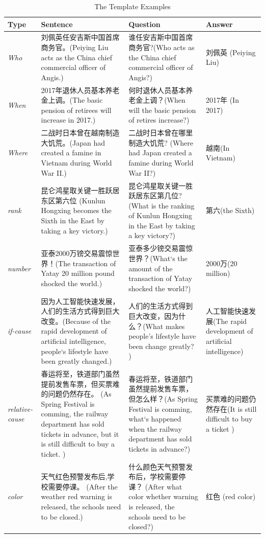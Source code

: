 \documentclass[runningheads,UTF8,article]{comsis2}
\begin{document}
	
	
	\iffalse
	\begin{table}[!ht]
		\centering
		\caption{The Template Examples}
		\setlength\tabcolsep{0.5em}
		\label{example}
		\begin{tabular}{|p{25pt}|p{125pt} | p{120pt} |p{45pt}|}
			\hline
			Type& Sentence & Question & Answer \\
			\hline
			\emph{Who} & 刘佩英任安吉斯中国首席商务官。(Peiying Liu acts as the China chief commercial officer of Angis.) & 谁任安吉斯中国首席商务官?(Who acts as the China chief commercial officer of Angis?)& 刘佩英    (Peiying Liu)\\
			\hline
			\emph{When} & 2017年退休人员基本养老金上调。(The basic pension of retirees will increase in 2017.) & 何时退休人员基本养老金上调？(When will the basic pension of retires increase?) & 2017年 (In 2017) \\
			\hline
			\emph{Where} & 二战时日本曾在越南制造大饥荒。(Japan had created a famine in Vietnam during World War II.)& 二战时日本曾在哪里制造大饥荒?	(Where had Japan created a famine during World War II?) & 越南(In Vietnam)\\
			\hline
			\emph{rank}& 昆仑鸿星取关键一胜跃居东区第六位 (Kunlun Hongxing becomes the Sixth in the East by taking a key victory.)& 昆仑鸿星取关键一胜跃居东区第几位?(What is the ranking of Kunlun Hongxing in the East by taking a key victory?)& 第六(the Sixth)\\
			\hline
			\emph{number}& 亚泰2000万镑交易震惊世界！(The transaction of Yatay 20 million pound shocked the world.)& 亚泰多少镑交易震惊世界？(What`s the amount of the transaction of Yatay shocked the world?)& 2000万(20 million) \\
			\hline
			\emph{if-cause}& 因为人工智能快速发展，人们的生活方式得到巨大改变。(Because of the rapid development of artificial intelligence, people`s lifestyle have been greatly changed.)&	人们的生活方式得到巨大改变，因为什么？(What makes people's lifestyle have been change greatly? )&	人工智能快速发展(The rapid development of artificial intelligence)\\
			\hline
			\emph{relative-cause}& 春运将至，铁道部门虽然提前发售车票，但买票难的问题仍然存在。	(As Spring Festival is comming, the railway department has sold tickets in advance, but it is still difficult to buy a ticket. )&春运将至，铁道部门虽然提前发售车票，但怎么样？(As Spring Festival is comming, what`s happened when the railway department has sold tickets in advance?)&	买票难的问题仍然存在(It is still difficult to buy a ticket )\\
			
			\hline
			\emph{color} & 天气红色预警发布后,学校需要停课。 (After the weather red warning is released, the schools need to be closed.) &   什么颜色天气预警发布后，学校需要停课？ (After what color whether warning is released, the schools need to be closed?)  & 红色 (red color)\\ 
			\hline
		\end{tabular}
	\end{table}
	
\end{document}
